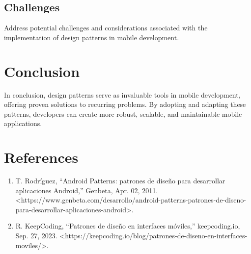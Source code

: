 \documentclass{article}
\begin{document}
	\subsection{Challenges}
	Address potential challenges and considerations associated with the implementation of design patterns in mobile development.
	
	\section{Conclusion}
	In conclusion, design patterns serve as invaluable tools in mobile development, offering proven solutions to recurring problems. By adopting and adapting these patterns, developers can create more robust, scalable, and maintainable mobile applications.
	
	\section{References}
	\begin{enumerate}
		\item T. Rodríguez, “Android Patterns: patrones de diseño para desarrollar aplicaciones Android,” Genbeta, Apr. 02, 2011. \textless https://www.genbeta.com/desarrollo/android-patterns-patrones-de-diseno-para-desarrollar-aplicaciones-android\textgreater.
		\item R. KeepCoding, “Patrones de diseño en interfaces móviles,” keepcoding.io, Sep. 27, 2023. \textless https://keepcoding.io/blog/patrones-de-diseno-en-interfaces-moviles/\textgreater.
	\end{enumerate}
	
\end{document}
